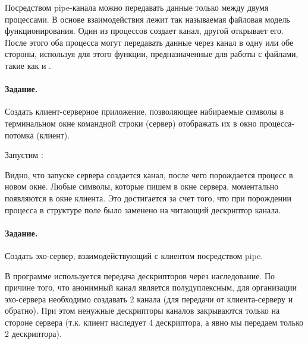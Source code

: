 Посредством pipe-канала можно передавать данные только между двумя процессами. В основе взаимодействия лежит так называемая файловая модель функционирования. Один из процессов создает канал, другой открывает его. После этого оба процесса могут передавать данные через канал в одну или обе стороны, используя для этого функции, предназначенные для работы с файлами, такие как  и .

\paragraph{Задание.} Создать клиент-серверное приложение, позволяющее набираемые символы в терминальном окне командной строки (сервер) отображать их в окно процесса-потомка (клиент).





Запустим :





Видно, что запуске сервера создается канал, после чего порождается процесс  в новом окне. Любые символы, которые пишем в окне сервера, моментально появляются в окне клиента. Это достигается за счет того, что при порождении процесса в структуре  поле  было заменено на читающий дескриптор канала.

\paragraph{Задание.} Создать эхо-сервер, взаимодействующий с клиентом посредством pipe.

В программе используется передача дескрипторов через наследование. По причине того, что анонимный канал является полудуплексным, для организации эхо-сервера необходимо создавать 2 канала (для передачи от клиента-серверу и обратно). При этом ненужные дескрипторы каналов закрываются только на стороне сервера (т.к. клиент наследует 4 дескриптора, а явно мы передаем только 2 дескриптора).



